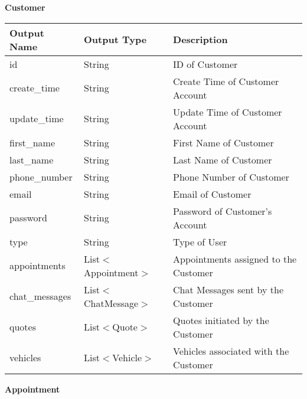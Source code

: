 \documentclass[12pt, titlepage]{article}
\begin{document}
\textbf{Customer}

\begin{table}[H]
	\begin{tabular}{|p{}|p{}|p{}|}
		\hline
		\textbf{Output Name} & \textbf{Output Type}  & \textbf{Description}                  \\
		\hline
		id                   & String                & ID of Customer                        \\
		\hline
		create\_time         & String                & Create Time of Customer Account       \\
		\hline
		update\_time         & String                & Update Time of Customer Account       \\
		\hline
		first\_name          & String                & First Name of Customer                \\
		\hline
		last\_name           & String                & Last Name of Customer                 \\
		\hline
		phone\_number        & String                & Phone Number of Customer              \\
		\hline
		email                & String                & Email of Customer                     \\
		\hline
		password             & String                & Password of Customer's Account        \\
		\hline
		type                 & String                & Type of User                          \\
		\hline
		appointments         & List$<$Appointment$>$ & Appointments assigned to the Customer \\
		\hline
		chat\_messages       & List$<$ChatMessage$>$ & Chat Messages sent by the Customer    \\
		\hline
		quotes               & List$<$Quote$>$       & Quotes initiated by the Customer      \\
		\hline
		vehicles             & List$<$Vehicle$>$     & Vehicles associated with the Customer \\
		\hline
	\end{tabular}
\end{table}

\textbf{Appointment}
\end{document}
